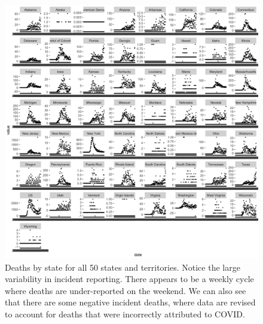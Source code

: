 \documentclass[11pt]{amsart}
\begin{document}
 \begin{figure}
     \centering
     \includegraphics[scale=.175]{data_plot.png}
     \caption{Deaths by state for all 50 states and territories. Notice the large variability in incident reporting. There appears to be a weekly cycle where deaths are under-reported on the weekend. We can also see that there are some negative incident deaths, where data are revised to account for deaths that were incorrectly attributed to COVID. }
     \label{fig:data}
 \end{figure}
 
\end{document}
